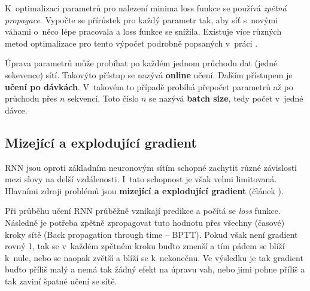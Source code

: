 
K~optimalizaci parametrů pro nalezení minima loss funkce se používá \emph{zpětná propagace}. Vypočte se přírůstek pro každý parametr tak, aby síť s~novými váhami o~něco lépe pracovala a loss funkce se snížila. Existuje více různých metod optimalizace pro tento výpočet podrobně popsaných v~práci \cite{gradientDescent}.

Úprava parametrů může probíhat po každém jednom průchodu dat (jedné sekevence) sítí. Takovýto přístup se nazývá \textbf{online} učení. Dalším přístupem je \textbf{učení po dávkách}. V~takovém to případě probíhá přepočet parametrů až po průchodu přes $n$ sekvencí. Toto číslo $n$ se nazývá \textbf{batch size}, tedy počet  v~jedné dávce.

%
%
%


\subsection{Mizející a explodující gradient} \label{subsection:gradient}
RNN jsou oproti základním neuronovým sítím schopné zachytit různé závislosti mezi slovy na delší vzdálenosti. I~tato schopnost je však velmi limitovaná. Hlavními zdroji problémů jsou \textbf{mizející a explodující gradient} (článek \cite{gradientProblems}).


Při průběhu učení RNN průběžně vznikají predikce a počítá se \emph{loss} funkce. Následně je potřeba zpětně zpropagovat tuto hodnotu přes všechny (časové) kroky sítě (Back propagation through time -- BPTT). Pokud však není gradient rovný 1, tak se v~každém zpětném kroku buďto zmenší a tím pádem se blíží k~nule, nebo se naopak zvětší a blíží se k~nekonečnu. Ve výsledku je tak gradient buďto příliš malý a nemá tak žádný efekt na úpravu vah, nebo jimi pohne příliš a tak zaviní špatné učení se sítě.

